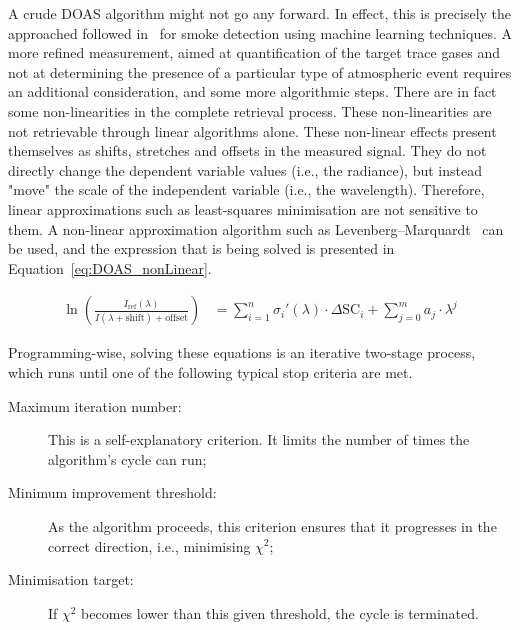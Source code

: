 A crude \gls{DOAS} algorithm might not go any forward. In effect, this
is precisely the approached followed in~\cite{ValentedeAlmeida2017} for
smoke detection using machine learning techniques. A more refined
measurement, aimed at quantification of the target trace gases and not
at determining the presence of a particular type of atmospheric event
requires an additional consideration, and some more algorithmic steps.
There are in fact some non-linearities in the complete retrieval
process. These non-linearities are not retrievable through linear
algorithms alone. These non-linear effects present themselves as shifts,
stretches and offsets in the measured signal. They do not directly
change the dependent variable values (i.e., the radiance), but instead
"move" the scale of the independent variable (i.e., the wavelength).
Therefore, linear approximations such as least-squares minimisation are
not sensitive to them. A non-linear approximation algorithm such as
Levenberg--Marquardt~\cite{Press2007} can be used, and the expression
that is being solved is presented in Equation~\ref{eq:DOAS_nonLinear}.

\begin{equation}
    \label{eq:DOAS_nonLinear}
    \begin{aligned}
        \ln \left( \frac{I_\mathrm{ref}(\lambda)}{I(\lambda +
            \mathrm{shift}) + \mathrm{offset}} \right) &= \sum_{i=1}^{n}
                \sigma_{i}{'}(\lambda) \cdot \Delta \mathrm{SC}_{i} + 
                    \sum_{j=0}^{m} a_{j} \cdot \lambda^{j}
    \end{aligned}
\end{equation}

Programming-wise, solving these equations is an iterative two-stage
process, which runs until one of the following typical stop criteria are
met.

\begin{description}
    \item[Maximum iteration number:] This is a self-explanatory
        criterion. It limits the number of times the algorithm's cycle
        can run; 
    \item[Minimum improvement threshold:] As the algorithm proceeds,
        this criterion ensures that it progresses in the correct
        direction, i.e., minimising $\chi^2$;
    \item[Minimisation target:] If $\chi^2$ becomes lower than this
        given threshold, the cycle is terminated. 
\end{description}

